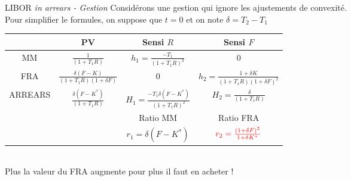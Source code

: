 \documentclass{beamer}
\begin{document}
\begin{frame}{LIBOR \it{in arrears} \textnormal{- Gestion}}
Considérons une gestion qui ignore les ajustements de convexité.\\
\vspace{0.5cm}
Pour simplifier le formules, on suppose que $t=0$ et on note $\delta = T_2-T_1$\\
\vspace{0.5cm}
\small
\begin{tabular}{|c|c|c|c|}
\hline
& PV & Sensi $R$ & Sensi $F$\\
\hline
MM & $\frac{1}{(1+T_1 R)}$ & $h_1=\frac{-T_1}{(1+T_1 R)^2}$ & 0 \\
\hline
FRA & $\frac{\delta(F-K)}{(1+T_1 R)(1+\delta F)}$ &  0 &  $h_2=\frac{1+\delta K}{(1+ T_1 R)(1+\delta F)^2}$\\
\hline
ARREARS & $\frac{\delta(F-K^*)}{(1+T_1 R)}$ & $H_1=\frac{-T_1 \delta (F-K^*)}{(1+ T_1 R)^2}$ &  $H_2=\frac{\delta}{(1+ T_1 R)}$\\
\hline
& & Ratio MM & Ratio FRA\\
\hline
&& $r_1=\delta(F-K^*)$ & $\color{red}{r_2=\frac{ (1+\delta F)^2}{1+\delta K^*}}$\\
\hline
\end{tabular}\\
\normalsize
\vspace{0.5cm}
Plus la valeur du FRA augmente pour plus il faut en acheter !
\end{frame}
\end{document}
